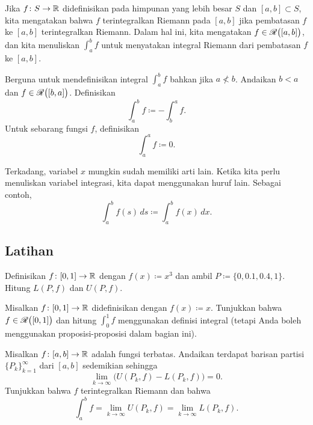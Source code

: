 Jika $f \colon S \to {\mathbb{R}}$ didefinisikan pada himpunan yang lebih besar $S$ dan
$[a,b] \subset S$,
kita mengatakan bahwa $f$ terintegralkan Riemann pada $[a,b]$ jika pembatasan $f$
ke $[a,b]$ terintegralkan Riemann.
Dalam hal ini,
kita mengatakan $f \in {\mathscr{R}}\bigl([a,b]\bigr)$,
dan
kita menuliskan $\int_a^b f$ untuk menyatakan integral Riemann
dari pembatasan $f$ ke $[a,b]$.

Berguna untuk mendefinisikan integral $\int_a^b f$ bahkan jika
$a \nless b$.  Andaikan $b < a$ dan $f \in {\mathscr{R}}\bigl([b,a]\bigr)$.
Definisikan
\begin{equation*}
\int_a^b f \coloneqq - \int_b^a f .
\end{equation*}
Untuk sebarang fungsi $f$, definisikan
\begin{equation*}
\int_a^a f \coloneqq 0 .
\end{equation*}

Terkadang, variabel $x$ mungkin sudah memiliki arti lain.  Ketika
kita perlu menuliskan variabel integrasi, kita dapat
menggunakan huruf lain.  Sebagai contoh,
\begin{equation*}
\int_a^b f(s)\,ds \coloneqq \int_a^b f(x)\,dx .
\end{equation*}

\subsection{Latihan}

\begin{exercise}
Definisikan $f \colon [0,1] \to {\mathbb{R}}$ dengan $f(x) \coloneqq x^3$
dan ambil $P \coloneqq \{ 0, 0.1, 0.4, 1 \}$.  Hitung $L(P,f)$ dan $U(P,f)$.
\end{exercise}

\begin{exercise}
Misalkan $f \colon [0,1] \to {\mathbb{R}}$ didefinisikan dengan $f(x) \coloneqq x$.
Tunjukkan bahwa $f \in {\mathscr{R}}\bigl([0,1]\bigr)$ dan
hitung $\int_0^1 f$ menggunakan definisi integral
(tetapi
Anda boleh menggunakan proposisi-proposisi dalam bagian ini).%
\end{exercise}

\begin{exercise}
Misalkan $f \colon [a,b] \to {\mathbb{R}}$ adalah fungsi terbatas.
Andaikan terdapat barisan partisi $\{ P_k \}_{k=1}^\infty$ dari $[a,b]$
sedemikian sehingga
\begin{equation*}
\lim_{k \to \infty} \bigl( U(P_k,f) - L(P_k,f) \bigr) = 0 .
\end{equation*}
Tunjukkan bahwa $f$ terintegralkan Riemann dan bahwa
\begin{equation*}
\int_a^b f = 
\lim_{k \to \infty} U(P_k,f)
=
\lim_{k \to \infty} L(P_k,f) .
\end{equation*}
\end{exercise}


